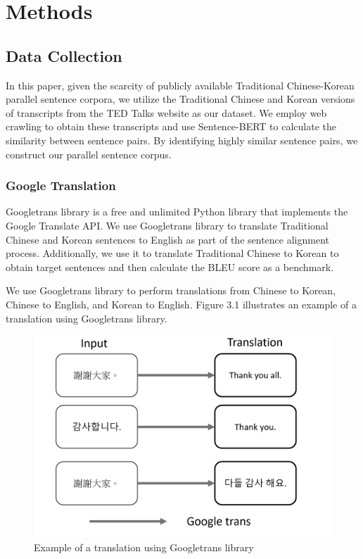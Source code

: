 \documentclass[PhD]{PHlab-thesis}
\begin{document}
\chapter{Methods}
\section{Data Collection}
In this paper, given the scarcity of publicly available Traditional Chinese-Korean parallel sentence corpora, we utilize the Traditional Chinese and Korean versions of transcripts from the TED Talks website\cite{tedTalks} as our dataset. We employ web crawling to obtain these transcripts and use Sentence-BERT\cite{reimers2019sentence} to calculate the similarity between sentence pairs. By identifying highly similar sentence pairs, we construct our parallel sentence corpus.

\subsection{Google Translation}
Googletrans library\cite{googletrans} is a free and unlimited Python library that implements the Google Translate API. We use Googletrans library to translate Traditional Chinese and Korean sentences to English as part of the sentence alignment process. Additionally, we use it to translate Traditional Chinese to Korean to obtain target sentences and then calculate the BLEU score as a benchmark.

We use Googletrans library to perform translations from Chinese to Korean, Chinese to English, and Korean to English. Figure 3.1 illustrates an example of a translation using Googletrans library.

\begin{figure}[h!]
  \centering
  \includegraphics[width=\linewidth]{fig_3_1.jpg}
  \captionsetup{type=figure}
  \caption{Example of a translation using Googletrans library}
  \label{fig:googletrans}
\end{figure}
\end{document}

